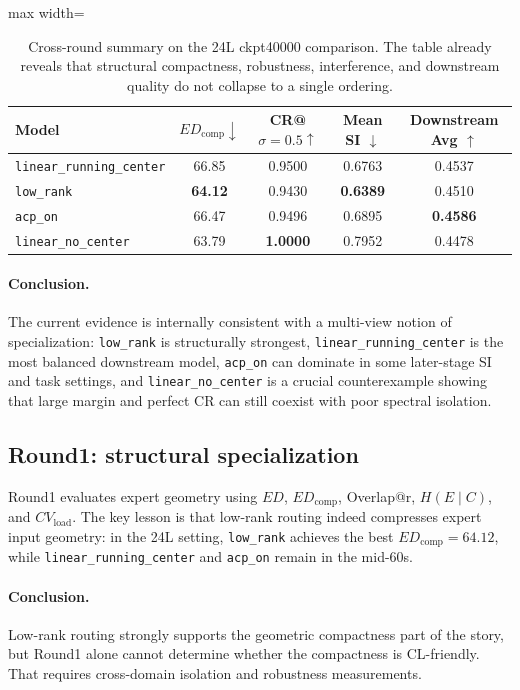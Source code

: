 \documentclass[11pt]{article}
\newcommand{\tablesize}{\footnotesize}
\begin{document}
\begin{table}[H]
\centering
\tablesize
\begin{adjustbox}{max width=\linewidth}
\begin{tabular}{lcccc}
\toprule
Model & $ED_{\mathrm{comp}} \downarrow$ & CR@$\sigma{=}0.5 \uparrow$ & Mean SI $\downarrow$ & Downstream Avg $\uparrow$ \\
\midrule
\texttt{linear\_running\_center} & 66.85 & 0.9500 & 0.6763 & 0.4537 \\
\texttt{low\_rank} & \textbf{64.12} & 0.9430 & \textbf{0.6389} & 0.4510 \\
\texttt{acp\_on} & 66.47 & 0.9496 & 0.6895 & \textbf{0.4586} \\
\texttt{linear\_no\_center} & 63.79 & \textbf{1.0000} & 0.7952 & 0.4478 \\
\bottomrule
\end{tabular}
\end{adjustbox}
\caption{Cross-round summary on the 24L ckpt40000 comparison. The table already reveals that structural compactness, robustness, interference, and downstream quality do not collapse to a single ordering.}
\label{tab:24l-summary}
\end{table}

\paragraph{Conclusion.} The current evidence is internally consistent with a multi-view notion of specialization: \texttt{low\_rank} is structurally strongest, \texttt{linear\_running\_center} is the most balanced downstream model, \texttt{acp\_on} can dominate in some later-stage SI and task settings, and \texttt{linear\_no\_center} is a crucial counterexample showing that large margin and perfect CR can still coexist with poor spectral isolation.

\subsection{Round1: structural specialization}
Round1 evaluates expert geometry using $ED$, $ED_{\mathrm{comp}}$, Overlap@r, $H(E\mid C)$, and $CV_{\mathrm{load}}$. The key lesson is that low-rank routing indeed compresses expert input geometry: in the 24L setting, \texttt{low\_rank} achieves the best $ED_{\mathrm{comp}}=64.12$, while \texttt{linear\_running\_center} and \texttt{acp\_on} remain in the mid-60s.

\paragraph{Conclusion.} Low-rank routing strongly supports the geometric compactness part of the story, but Round1 alone cannot determine whether the compactness is CL-friendly. That requires cross-domain isolation and robustness measurements.
\end{document}
